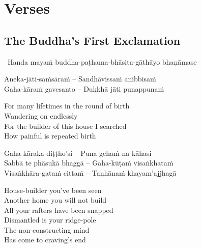 
\ifdigitalversion
\else
\fi

\chapter{Verses}



\section{The Buddha's First Exclamation}
\label{buddhas-first-exclamation}

\begin{leader}
  \anglebracketleft\ \hspace{-0.5mm}Handa mayaṁ buddha-paṭhama-bhāsita-gāthāyo bhaṇāmase \hspace{-0.5mm}\anglebracketright\
\end{leader}

\begin{verses}
  Aneka-jāti-saṁsāraṁ – Sandhāvissaṁ anibbisaṁ\\
  Gaha-kāraṁ gavesanto – Dukkhā jāti punappunaṁ
\end{verses}

\begin{english-verses}
  For many lifetimes in the round of birth\\
  Wandering on endlessly\\
  For the builder of this house I searched\\
  How painful is repeated birth
\end{english-verses}

\begin{verses}
  Gaha-kāraka diṭṭho'si – Puna gehaṁ na kāhasi\\
  Sabbā te phāsukā bhaggā – Gaha-kūṭaṁ visaṅkhataṁ\\
  Visaṅkhāra-gataṁ cittaṁ – Taṇhānaṁ khayam'ajjhagā
\end{verses}

\begin{english-verses}
  House-builder you've been seen\\
  Another home you will not build\\
  All your rafters have been snapped\\
  Dismantled is your ridge-pole\\
  The non-constructing mind\\
  Has come to craving's end
\end{english-verses}

